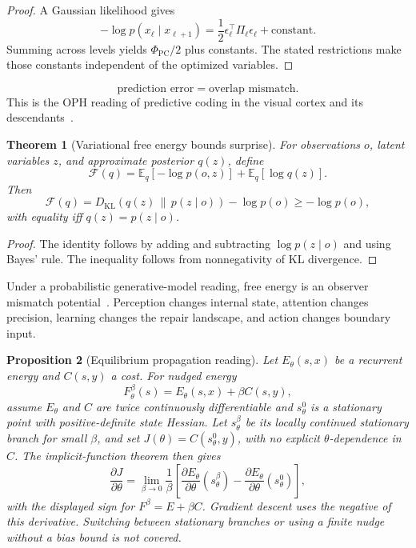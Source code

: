 \documentclass[11pt]{article}
\newtheorem{theorem}{Theorem}[section]
\newtheorem{proposition}[theorem]{Proposition}
\theoremstyle{remark}
\theoremstyle{plain}
\newcommand{\E}{\mathbb E}
\begin{document}
\begin{proof}
A Gaussian likelihood gives
\[
-\log p(x_\ell\mid x_{\ell+1})
=
\frac12\epsilon_\ell^\top\Pi_\ell\epsilon_\ell+\mathrm{constant}.
\]
Summing across levels yields \(\Phi_{\mathrm{PC}}/2\) plus constants. The stated restrictions make those constants independent of the optimized variables.
\end{proof}

\[
\boxed{
\text{prediction error}=\text{overlap mismatch}.
}
\]
This is the OPH reading of predictive coding in the visual cortex and its descendants~\cite{RaoBallard1999}.

\begin{theorem}[Variational free energy bounds surprise]
For observations \(o\), latent variables \(z\), and approximate posterior \(q(z)\), define
\[
\mathcal F(q)=
\E_q[-\log p(o,z)]+\E_q[\log q(z)].
\]
Then
\[
\mathcal F(q)
=
D_{\mathrm{KL}}\!\left(q(z)\,\|\,p(z\mid o)\right)
-\log p(o)
\ge
-\log p(o),
\]
with equality iff \(q(z)=p(z\mid o)\).
\end{theorem}

\begin{proof}
The identity follows by adding and subtracting \(\log p(z\mid o)\) and using Bayes' rule. The inequality follows from nonnegativity of KL divergence.
\end{proof}

Under a probabilistic generative-model reading, free energy is an observer mismatch potential~\cite{Friston2010}. Perception changes internal state, attention changes precision, learning changes the repair landscape, and action changes boundary input.

\begin{proposition}[Equilibrium propagation reading]
Let \(E_\theta(s,x)\) be a recurrent energy and \(C(s,y)\) a cost. For nudged energy
\[
F_\theta^\beta(s)=E_\theta(s,x)+\beta C(s,y),
\]
assume \(E_\theta\) and \(C\) are twice continuously differentiable and
\(s_\theta^0\) is a stationary point with positive-definite state Hessian.
Let \(s_\theta^\beta\) be its locally continued stationary branch for small
\(\beta\), and set \(J(\theta)=C(s_\theta^0,y)\), with no explicit
\(\theta\)-dependence in \(C\). The implicit-function theorem then gives
\[
\frac{\partial J}{\partial\theta}
=
\lim_{\beta\to0}
\frac1\beta
\left[
\frac{\partial E_\theta}{\partial\theta}(s_\theta^\beta)
-
\frac{\partial E_\theta}{\partial\theta}(s_\theta^0)
\right],
\]
with the displayed sign for \(F^\beta=E+\beta C\). Gradient descent uses
the negative of this derivative. Switching between stationary branches or
using a finite nudge without a bias bound is not covered.
\end{proposition}
\end{document}
